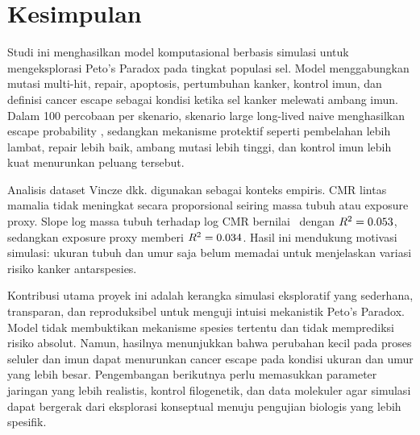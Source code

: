 \section{Kesimpulan}

Studi ini menghasilkan model komputasional berbasis simulasi untuk
mengeksplorasi Peto's Paradox pada tingkat populasi sel. Model menggabungkan
mutasi multi-hit, repair, apoptosis, pertumbuhan kanker, kontrol imun, dan
definisi cancer escape sebagai kondisi ketika sel kanker melewati ambang imun.
Dalam 100 percobaan per skenario, skenario large long-lived naive menghasilkan
escape probability \NaiveEscapeProbability{}, sedangkan mekanisme protektif
seperti pembelahan lebih lambat, repair lebih baik, ambang mutasi lebih tinggi,
dan kontrol imun lebih kuat menurunkan peluang tersebut.

Analisis dataset Vincze dkk. digunakan sebagai konteks empiris. CMR lintas
mamalia tidak meningkat secara proporsional seiring massa tubuh atau exposure
proxy. Slope log massa tubuh terhadap log CMR bernilai \MassSlope\ dengan
$R^2=0.053$, sedangkan exposure proxy memberi $R^2=0.034$. Hasil ini
mendukung motivasi simulasi: ukuran tubuh dan umur saja belum memadai untuk
menjelaskan variasi risiko kanker antarspesies.

Kontribusi utama proyek ini adalah kerangka simulasi eksploratif yang sederhana,
transparan, dan reproduksibel untuk menguji intuisi mekanistik Peto's Paradox. Model tidak
membuktikan mekanisme spesies tertentu dan tidak memprediksi risiko absolut.
Namun, hasilnya menunjukkan bahwa perubahan kecil pada proses seluler dan imun
dapat menurunkan cancer escape pada kondisi ukuran dan umur yang lebih besar.
Pengembangan berikutnya perlu memasukkan parameter jaringan yang lebih realistis,
kontrol filogenetik, dan data molekuler agar simulasi dapat bergerak dari
eksplorasi konseptual menuju pengujian biologis yang lebih spesifik.
